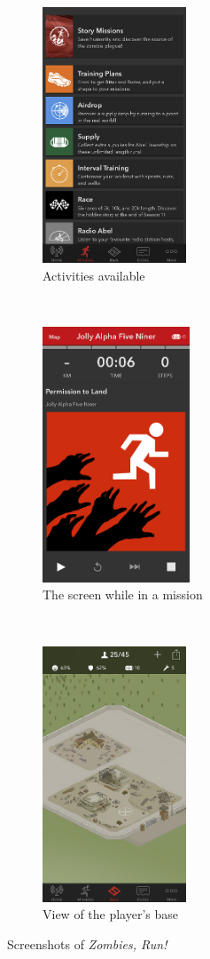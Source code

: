 \begin{figure}[h]
	\centering
	\begin{subfigure}[t]{0.3\textwidth}
		\centering
		\includegraphics[height=3in]{Figures/zombies-run-activities}
		\caption{Activities available}
	\end{subfigure}
	~
	\begin{subfigure}[t]{0.3\textwidth}
		\centering
		\includegraphics[height=3in]{Figures/zombies-run-mission}
		\caption{The screen while in a mission}
	\end{subfigure}
	~
	\begin{subfigure}[t]{0.3\textwidth}
		\centering
		\includegraphics[height=3in]{Figures/zombies-run-base}
		\caption{View of the player's base}
	\end{subfigure}
	\caption{Screenshots of \emph{Zombies, Run!}}
\end{figure}

